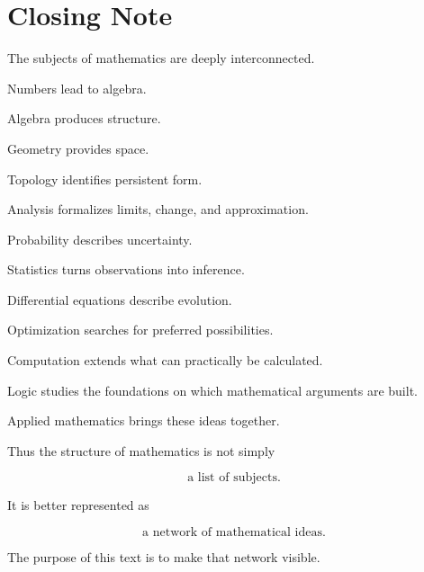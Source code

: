\section*{Closing Note}

The subjects of mathematics are deeply interconnected.

Numbers lead to algebra.

Algebra produces structure.

Geometry provides space.

Topology identifies persistent form.

Analysis formalizes limits, change, and approximation.

Probability describes uncertainty.

Statistics turns observations into inference.

Differential equations describe evolution.

Optimization searches for preferred possibilities.

Computation extends what can practically be calculated.

Logic studies the foundations on which mathematical arguments are built.

Applied mathematics brings these ideas together.

Thus the structure of mathematics is not simply

\[
\boxed{
\text{a list of subjects}.
}
\]

It is better represented as

\[
\boxed{
\text{a network of mathematical ideas}.
}
\]

The purpose of this text is to make that network visible.


%
%
%
%
